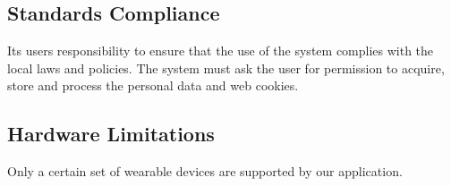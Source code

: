\subsection{Standards Compliance}
\qquad Its users responsibility to ensure that the use of the system complies with the local laws and policies. The system must ask the user for permission to acquire, store and process the personal data and web cookies.

\subsection{Hardware Limitations}
\qquad Only a certain set of wearable devices are supported by our application. 
